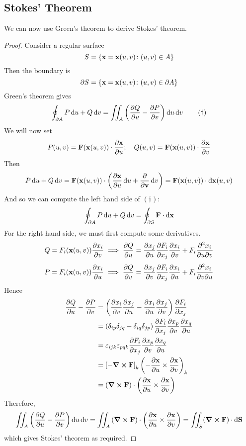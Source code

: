 \documentclass{article}
\begin{document}
\subsection{Stokes' Theorem}
We can now use Green's theorem to derive Stokes' theorem.
\begin{proof}
	Consider a regular surface
	\[ S = \left\{ \vb x = \vb x(u, v) \colon (u, v) \in A \right\} \]
	Then the boundary is
	\[ \partial S = \left\{ \vb x = \vb x(u, v) \colon (u, v) \in \partial A \right\} \]
	Green's theorem gives
	\begin{equation}
		\oint_{\partial A} P \dd{u} + Q \dd{v} = \iint_A \left( \pdv{Q}{u} - \pdv{P}{v} \right) \dd{u}\dd{v}
		\tag{$\dagger$}
	\end{equation}
	We will now set
	\[ P(u, v) = \vb F(\vb x(u, v)) \cdot \pdv{\vb x}{u};\quad Q(u, v) = \vb F(\vb x(u, v)) \cdot \pdv{\vb x}{v} \]
	Then
	\[ P \dd{u} + Q \dd{v} = \vb F(\vb x(u, v)) \cdot \left( \pdv{\vb x}{u} \dd{u} + \pdv{\vb v} \dd{v} \right) = \vb F(\vb x(u, v)) \cdot \dd{\vb x(u, v)} \]
	And so we can compute the left hand side of $(\dagger)$:
	\[ \oint_{\partial A} P \dd{u} + Q \dd{v} = \oint_{\partial S} \vb F \cdot \dd{\vb x} \]
	For the right hand side, we must first compute some derivatives.
	\[ Q = F_i(\vb x(u, v))\pdv{x_i}{v} \implies \pdv{Q}{u} = \pdv{x_j}{u}\pdv{F_i}{x_j}\pdv{x_i}{v} + F_i \pdv{x_i}{u}{v} \]
	\[ P = F_i(\vb x(u, v))\pdv{x_i}{u} \implies \pdv{Q}{v} = \pdv{x_j}{v}\pdv{F_i}{x_j}\pdv{x_i}{u} + F_i \pdv{x_i}{v}{u} \]
	Hence
	\begin{align*}
		\pdv{Q}{u} - \pdv{P}{v} & = \left( \pdv{x_i}{v}\pdv{x_j}{u} - \pdv{x_i}{u}\pdv{x_j}{v} \right) \pdv{F_i}{x_j}                       \\
		                        & = \left( \delta_{ip} \delta_{jq} - \delta_{iq} \delta_{jp} \right) \pdv{F_i}{x_j}\pdv{x_p}{v}\pdv{x_q}{u} \\
		                        & = \varepsilon_{ijk} \varepsilon_{pqk} \pdv{F_i}{x_j}\pdv{x_p}{v}\pdv{x_q}{u}                              \\
		                        & = \left[ -\curl{\vb F} \right]_k \left( -\pdv{\vb x}{u} \times \pdv{\vb x}{v} \right)_k                   \\
		                        & = \left( \curl{\vb F} \right) \cdot \left( \pdv{\vb x}{u} \times \pdv{\vb x}{v} \right)                   \\
	\end{align*}
	Therefore,
	\[ \iint_{A} \left( \pdv{Q}{u} - \pdv{P}{v} \right) \dd{u}\dd{v} = \iint_{A} \left( \curl{\vb F} \right) \cdot \left( \pdv{\vb x}{u} \times \pdv{\vb x}{v} \right) = \iint_{S} (\curl{\vb F}) \cdot \dd{\vb S} \]
	which gives Stokes' theorem as required.
\end{proof}
\end{document}
